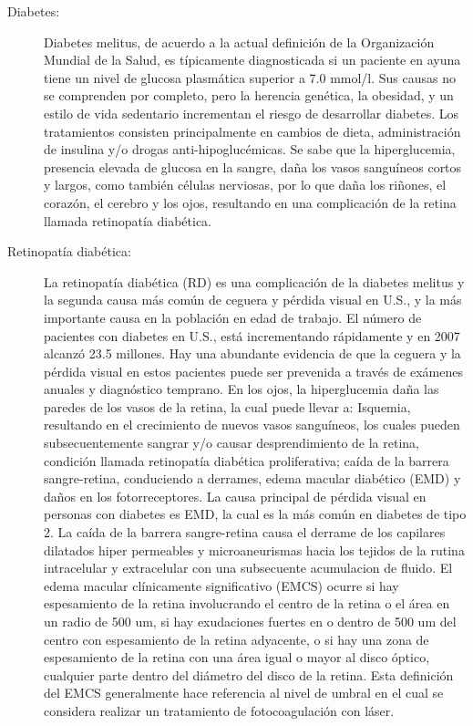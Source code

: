 \begin{description}
    \item[Diabetes:] Diabetes melitus, de acuerdo a la actual definición de la Organización Mundial de la Salud, es típicamente diagnosticada si un paciente en ayuna tiene un nivel de glucosa plasmática superior a 7.0 mmol/l. Sus causas no se comprenden por completo, pero la herencia genética, la obesidad, y un estilo de vida sedentario incrementan el riesgo de desarrollar diabetes. Los tratamientos consisten principalmente en cambios de dieta, administración de insulina y/o drogas anti-hipoglucémicas. Se sabe que la hiperglucemia, presencia elevada de glucosa en la sangre, daña los vasos sanguíneos cortos y largos, como también células nerviosas, por lo que daña los riñones, el corazón, el cerebro y los ojos, resultando en una complicación de la retina llamada retinopatía diabética.
    \item[Retinopatía diabética:] La retinopatía diabética (RD) es una complicación de la diabetes melitus y la segunda causa más común de ceguera y pérdida visual en U.S., y la más importante causa en la población en edad de trabajo. El número de pacientes con diabetes en U.S., está incrementando rápidamente y en 2007 alcanzó 23.5 millones. Hay una abundante evidencia de que la ceguera y la pérdida visual en estos pacientes puede ser prevenida a través de exámenes anuales y  diagnóstico temprano. En los ojos, la hiperglucemia daña las paredes de los vasos de la retina, la cual puede llevar a:
Isquemia, resultando en el crecimiento de nuevos vasos sanguíneos, los cuales pueden subsecuentemente sangrar y/o causar desprendimiento de la retina, condición llamada retinopatía diabética proliferativa;
caída de la barrera sangre-retina, conduciendo a derrames, edema macular diabético (EMD) y daños en los fotorreceptores.
La causa principal de pérdida visual en personas con diabetes es EMD, la cual es la más común en diabetes de tipo 2. La caída de la barrera sangre-retina causa el derrame de los capilares dilatados hiper permeables y microaneurismas hacia los tejidos de la rutina intracelular y extracelular con una subsecuente acumulacion de fluido. El edema macular clínicamente significativo (EMCS) ocurre si hay espesamiento de la retina involucrando el centro de la retina o el área en un radio de 500 um, si hay exudaciones fuertes en o dentro de 500 um del centro con espesamiento de la retina adyacente, o si hay una zona de espesamiento de la retina con una área igual o mayor al disco óptico, cualquier parte dentro del diámetro del disco de la retina. Esta definición del EMCS generalmente hace referencia al nivel de umbral en el cual se considera realizar un tratamiento de fotocoagulación con láser. 

\end{description}
